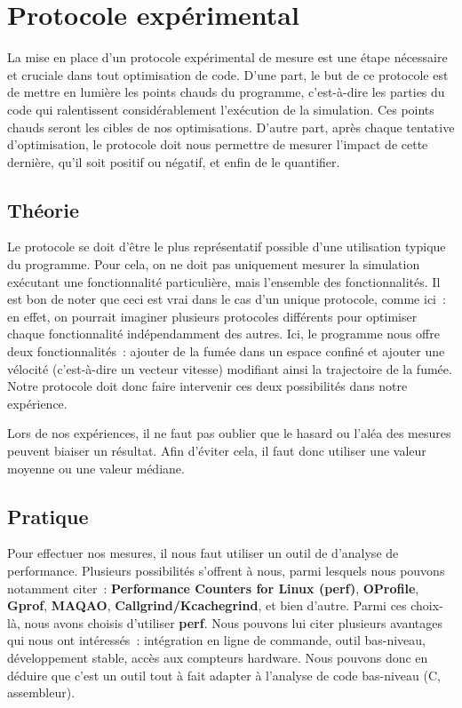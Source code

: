 \documentclass[12pt,a4paper]{article}
\begin{document}
\section{Protocole expérimental}
\label{sec.prot}

La mise en place d’un protocole expérimental de mesure est une étape nécessaire
et cruciale dans tout optimisation de code. D’une part, le but de ce protocole
est de mettre en lumière les points chauds du programme, c’est-à-dire les
parties du code qui ralentissent considérablement l’exécution de la simulation.
Ces points chauds seront les cibles de nos optimisations. D’autre part, après
chaque tentative d’optimisation, le protocole doit nous permettre de mesurer
l’impact de cette dernière, qu’il soit positif ou négatif, et enfin de le
quantifier.

\subsection{Théorie}
\label{sub.prot.theo}

Le protocole se doit d’être le plus représentatif possible d’une utilisation
typique du programme. Pour cela, on ne doit pas uniquement mesurer la simulation
exécutant une fonctionnalité particulière, mais l’ensemble des fonctionnalités.
Il est bon de noter que ceci est vrai dans le cas d’un unique protocole, comme
ici : en effet, on pourrait imaginer plusieurs protocoles différents pour
optimiser chaque fonctionnalité indépendamment des autres. Ici, le programme
nous offre deux fonctionnalités : ajouter de la fumée dans un espace confiné et
ajouter une vélocité (c’est-à-dire un vecteur vitesse) modifiant ainsi la
trajectoire de la fumée. Notre protocole doit donc faire intervenir ces deux
possibilités dans notre expérience.

Lors de nos expériences, il ne faut pas oublier que le hasard ou l’aléa des
mesures peuvent biaiser un résultat. Afin d’éviter cela, il faut donc utiliser
une valeur moyenne ou une valeur médiane.

\subsection{Pratique}
\label{sub.prot.pract}

Pour effectuer nos mesures, il nous faut utiliser un outil de d’analyse de
performance. Plusieurs possibilités s’offrent à nous, parmi lesquels nous
pouvons notamment citer : \textbf{Performance Counters for Linux (perf)},
\textbf{OProfile}, \textbf{Gprof}, \textbf{MAQAO},
\textbf{Callgrind/Kcachegrind}, et bien d’autre. Parmi ces choix-là, nous avons
choisis d’utiliser \textbf{perf}. Nous pouvons lui citer plusieurs avantages qui
nous ont intéressés : intégration en ligne de commande, outil bas-niveau,
développement stable, accès aux compteurs hardware. Nous pouvons donc en déduire
que c’est un outil tout à fait adapter à l’analyse de code bas-niveau (C,
assembleur).
\end{document}
